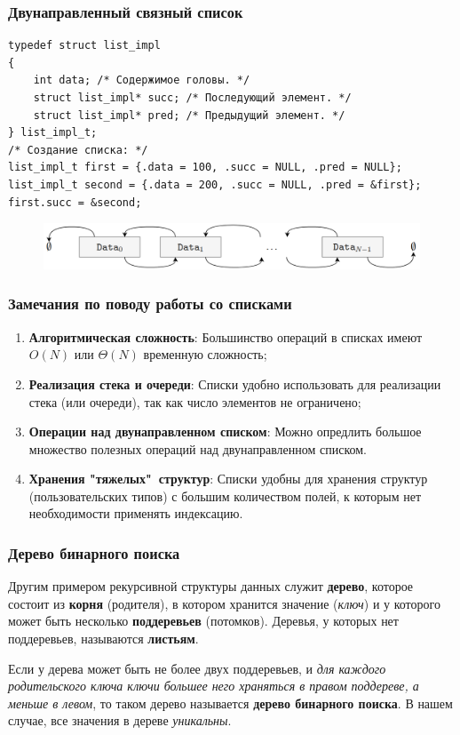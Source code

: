 \documentclass{beamer}
\begin{document}
    \begin{frame}[fragile]
        \frametitle{Двунаправленный связный список}
        \justifying
        \begin{verbatim}
typedef struct list_impl 
{
    int data; /* Содержимое головы. */
    struct list_impl* succ; /* Последующий элемент. */
    struct list_impl* pred; /* Предыдущий элемент. */
} list_impl_t;
/* Создание списка: */
list_impl_t first = {.data = 100, .succ = NULL, .pred = NULL};
list_impl_t second = {.data = 200, .succ = NULL, .pred = &first};
first.succ = &second;
        \end{verbatim}
        \begin{figure}[!tbp]
           \centering
           \includegraphics[width=\textwidth]{pics/list.png}
        \end{figure}
    \end{frame}
    \begin{frame}[fragile]
        \frametitle{Замечания по поводу работы со списками}
        \begin{enumerate}
            \justifying
            \item {\bf Алгоритмическая сложность}: Большинство операций в списках имеют $O(N)$ или $\Theta(N)$ временную сложность;
            \item {\bf Реализация стека и очереди}: Списки удобно использовать для реализации стека (или очереди), так как число элементов не ограничено;
            \item {\bf Операции над двунаправленном списком}: Можно опредлить большое множество полезных операций над двунаправленном списком.
            \item {\bf Хранения "тяжелых"\ структур}: Списки удобны для хранения структур (пользовательских типов) с большим количеством полей, к которым нет необходимости применять индексацию.
        \end{enumerate}
    \end{frame}
    \begin{frame}[fragile]
        \frametitle{Дерево бинарного поиска}
        \justifying
        Другим примером рекурсивной структуры данных служит {\bf дерево}, которое состоит из {\bf корня} (родителя), в котором хранится значение ({\it ключ}) и у которого может быть несколько {\bf поддеревьев} (потомков). Деревья, у которых нет поддеревьев, называются {\bf листьям}.
        \par
        \vspace{0.5cm}
        \justifying
        Если у дерева может быть не более двух поддеревьев, и {\it для каждого родительского ключа ключи большее него храняться в правом поддереве, а меньше в левом}, то таком дерево называется {\bf дерево бинарного поиска}. В нашем случае, все значения в дереве {\it уникальны}.
    \end{frame}
\end{document}
